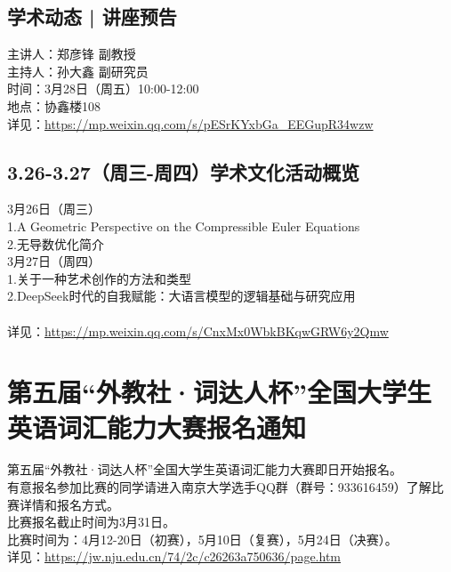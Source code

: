 \documentclass[letterpaper, 12pt]{article}
\begin{document}
\begin{multicols}{2}
\subsection{学术动态 | 讲座预告}
主讲人：郑彦锋 副教授
\\主持人：孙大鑫 副研究员
\\时间：3月28日（周五）10:00-12:00
\\地点：协鑫楼108
\\详见：\url{https://mp.weixin.qq.com/s/pESrKYxbGa_EEGupR34wzw}

\subsection{3.26-3.27（周三-周四）学术文化活动概览}
3月26日（周三）
\\1.A Geometric Perspective on the Compressible Euler Equations
\\2.无导数优化简介
\\3月27日（周四）
\\1.关于一种艺术创作的方法和类型
\\2.DeepSeek时代的自我赋能：大语言模型的逻辑基础与研究应用
\\
\\详见：\url{https://mp.weixin.qq.com/s/CnxMx0WbkBKqwGRW6y2Qmw}



\section{第五届“外教社·词达人杯”全国大学生英语词汇能力大赛报名通知}
第五届“外教社·词达人杯”全国大学生英语词汇能力大赛即日开始报名。
\\有意报名参加比赛的同学请进入南京大学选手QQ群（群号：933616459）了解比赛详情和报名方式。
\\比赛报名截止时间为3月31日。
\\比赛时间为：4月12-20日（初赛），5月10日（复赛），5月24日（决赛）。
\\详见：\url{https://jw.nju.edu.cn/74/2c/c26263a750636/page.htm}

\end{multicols}
\end{document}
